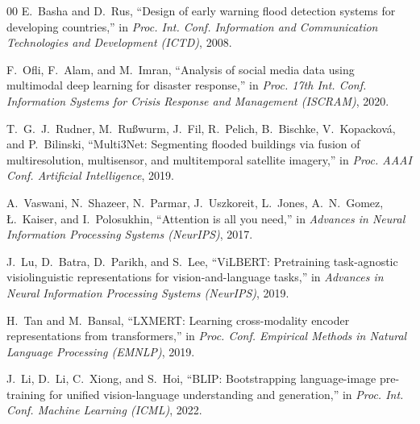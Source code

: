 \documentclass[journal]{IEEEtran}
\begin{document}
\begin{thebibliography}{00}
E.~Basha and D.~Rus, ``Design of early warning flood detection systems for developing countries,'' in \textit{Proc. Int. Conf. Information and Communication Technologies and Development (ICTD)}, 2008.

F.~Ofli, F.~Alam, and M.~Imran, ``Analysis of social media data using multimodal deep learning for disaster response,'' in \textit{Proc. 17th Int. Conf. Information Systems for Crisis Response and Management (ISCRAM)}, 2020.

T.~G.~J.~Rudner, M.~Rußwurm, J.~Fil, R.~Pelich, B.~Bischke, V.~Kopacková, and P.~Bilinski, ``Multi3Net: Segmenting flooded buildings via fusion of multiresolution, multisensor, and multitemporal satellite imagery,'' in \textit{Proc. AAAI Conf. Artificial Intelligence}, 2019.

A.~Vaswani, N.~Shazeer, N.~Parmar, J.~Uszkoreit, L.~Jones, A.~N.~Gomez, Ł.~Kaiser, and I.~Polosukhin, ``Attention is all you need,'' in \textit{Advances in Neural Information Processing Systems (NeurIPS)}, 2017.

J.~Lu, D.~Batra, D.~Parikh, and S.~Lee, ``ViLBERT: Pretraining task-agnostic visiolinguistic representations for vision-and-language tasks,'' in \textit{Advances in Neural Information Processing Systems (NeurIPS)}, 2019.

H.~Tan and M.~Bansal, ``LXMERT: Learning cross-modality encoder representations from transformers,'' in \textit{Proc. Conf. Empirical Methods in Natural Language Processing (EMNLP)}, 2019.

J.~Li, D.~Li, C.~Xiong, and S.~Hoi, ``BLIP: Bootstrapping language-image pre-training for unified vision-language understanding and generation,'' in \textit{Proc. Int. Conf. Machine Learning (ICML)}, 2022.

\end{thebibliography}
\end{document}
